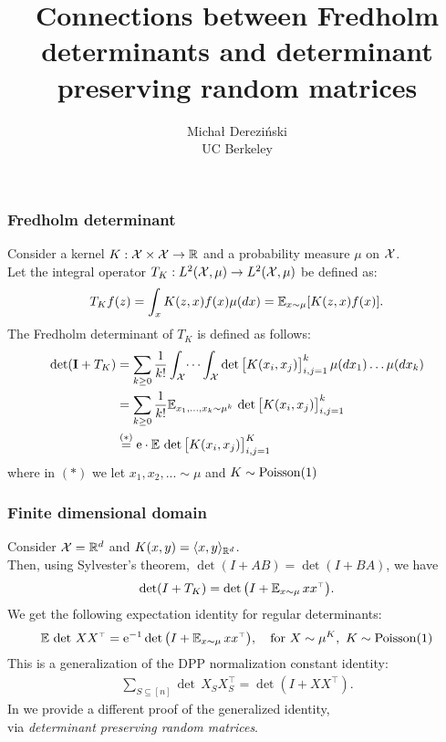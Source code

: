 \documentclass[10pt]{beamer}
\title[]{Connections between Fredholm determinants and determinant
  preserving random matrices}
\author[]{Micha{\l} Derezi\'{n}ski\\
UC Berkeley}
\begin{document}
\begin{frame}
  \titlepage
\end{frame}

\linespread{1.3}

\begin{frame}
  \frametitle{Fredholm determinant}
  Consider a kernel $K:\mathcal{X}\times \mathcal{X}\rightarrow \mathbb R$ and a
  probability measure $\mu$ on $\mathcal{X}$.\\
  Let the integral operator $T_K:L^2(\mathcal{X},\mu)\rightarrow L^2(\mathcal{X},\mu)$
  be defined as:
  \begin{align*}
    T_Kf(z) = \int_xK(z,x)f(x)\mu(dx) = \mathbb E_{x\sim\mu}[K(z,x)f(x)].
  \end{align*}
  The Fredholm determinant of $T_K$ is defined as follows:
  \begin{align*}
    \det(\mathbf I+T_K)
    &= \sum_{k\geq
      0}\frac1{k!}\int_{\mathcal{X}}\dots\int_{\mathcal{X}}\det\big[K(x_i,x_j)\big]_{i,j=1}^k\,\mu(dx_1)\dots\mu(dx_k)
    \\
    &=
      \sum_{k\geq
      0}\frac1{k!}\mathbb E_{x_1,...,x_k\sim\mu^k}\,\det\big[K(x_i,x_j)\big]_{i,j=1}^k
      \\
      &\overset{(*)}=\mathrm{e}\cdot\mathbb E\,\det\big[K(x_i,x_j)\big]_{i,j=1}^K
  \end{align*}
  where in $(*)$ we let $x_1,x_2,...\sim\mu$ and  $K\sim{\operatorname{Poisson}}(1)$
\end{frame}

\begin{frame}
  \frametitle{Finite dimensional domain}
Consider $\mathcal{X}=\mathbb R^d$ and $K(x,y)=\langle x, y\rangle_{\mathbb R^d}$.\\
Then, using Sylvester's theorem, $\det(I+AB)=\det(I+BA)$, we have
\begin{align*}
  \det(I + T_K) = \det\big(I + \E_{x\sim\mu}\,xx^\top\big).
\end{align*}
We get the following expectation identity for regular determinants:
\begin{align*}
\E\,\det\,XX^\top = \ee^{-1}\det\big( I+
  \E_{x\sim\mu}\,xx^\top\big),\quad\text{for } X\sim\mu^K,\  K\sim\Poisson(1)
\end{align*}
This is a generalization of the DPP normalization constant identity:
\begin{align*}
  \sum_{S\subseteq [n]}\det\,X_SX_S^\top = \det(I + XX^\top).
\end{align*}
In \cite{surrogate-design} we provide a different proof of the
generalized identity, \\
via \emph{determinant preserving random matrices}.
\end{frame}
\end{document}
